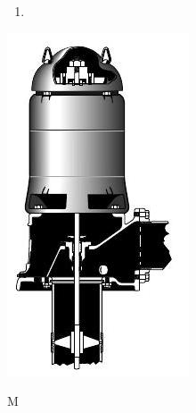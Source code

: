 \documentclass[10pt]{article}
\begin{document}
\begin{enumerate}
  \item 
\end{enumerate}
\includegraphics[max width=\textwidth]{2022_11_03_65aa625ded296bdfd01fg-23}

M
\end{document}
